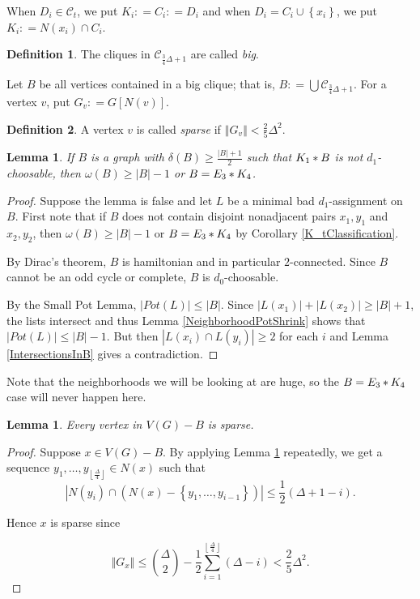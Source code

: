 \documentclass[12pt]{article}
\theoremstyle{plain}
\newtheorem{lem}[thm]{Lemma}
\theoremstyle{definition}
\newtheorem{defn}{Definition}
\theoremstyle{remark}
\newcommand{\fancy}[1]{\mathcal{#1}}
\newcommand{\CC}{\fancy{C}}
\newcommand{\set}[1]{\left\{ #1 \right\}}
\newcommand{\card}[1]{\left|#1\right|}
\newcommand{\size}[1]{\left\Vert#1\right\Vert}
\newcommand{\floor}[1]{\left\lfloor#1\right\rfloor}
\newcommand{\join}[2]{#1 \mbox{\hspace{2 pt}$\ast$\hspace{2 pt}} #2}
\newcommand{\DefinedAs}{\mathrel{\mathop:}=}
\begin{document}
\noindent When $D_i \in \CC_t$, we put $K_i \DefinedAs C_i \DefinedAs D_i$ and
when $D_i = C_i \cup \set{x_i}$, we put $K_i \DefinedAs N(x_i) \cap C_i$.

\begin{defn}
The cliques in $\CC_{\frac34 \Delta + 1}$ are called \emph{big}.
\end{defn}

Let $B$ be all vertices contained in a big clique; that is, $B \DefinedAs
\bigcup \CC_{\frac34 \Delta + 1}$. For a vertex $v$, put $G_v \DefinedAs G[N(v)]$.

\begin{defn}
A vertex $v$ is called \emph{sparse} if $\size{G_v} < \frac25 \Delta^2$.
\end{defn}

\begin{lem}\label{neighborhood}
If $B$ is a graph with $\delta(B) \geq \frac{\card{B} + 1}{2}$ such that
$\join{K_1}{B}$ is not $d_1$-choosable, then $\omega(B) \geq \card{B} - 1$ or
$B = \join{E_3}{K_4}$.
\end{lem}
\begin{proof}
Suppose the lemma is false and let $L$ be a minimal bad $d_1$-assignment on $B$.
First note that if $B$ does not contain disjoint nonadjacent pairs $x_1, y_1$
and $x_2, y_2$, then $\omega(B) \geq \card{B} - 1$ or
$B = \join{E_3}{K_4}$ by Corollary \ref{K_tClassification}.

By Dirac's theorem, $B$ is hamiltonian and in particular $2$-connected. Since
$B$ cannot be an odd cycle or complete, $B$ is $d_0$-choosable.

By the Small Pot Lemma, $\card{Pot(L)} \leq \card{B}$.  Since $\card{L(x_1)} +
\card{L(x_2)} \geq \card{B} + 1$, the lists intersect and thus Lemma
\ref{NeighborhoodPotShrink} shows that $\card{Pot(L)} \leq \card{B} - 1$. But
then $\card{L(x_i) \cap L(y_i)} \geq 2$ for each $i$ and Lemma
\ref{IntersectionsInB} gives a contradiction.
\end{proof}

Note that the neighborhoods we will be looking at are huge, so the $B =
\join{E_3}{K_4}$ case will never happen here.

\begin{lem}
Every vertex in $V(G) - B$ is sparse.
\end{lem}
\begin{proof}
Suppose $x \in V(G) - B$.
By applying Lemma \ref{neighborhood} repeatedly, we get a sequence $y_1,
\ldots, y_{\floor{\frac{\Delta}{4}}} \in N(x)$ such that 
\[\card{N(y_i) \cap (N(x) - \set{y_1, \ldots, y_{i-1}})} \leq \frac12 (\Delta +
1 - i).\]

\noindent Hence $x$ is sparse since

\[\size{G_x} \leq \binom{\Delta}{2} -
\frac12\sum_{i=1}^{\floor{\frac{\Delta}{4}}} (\Delta - i) < \frac25 \Delta^2.\]
\end{proof}
\end{document}
